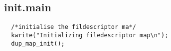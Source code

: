 \documentclass[a4paper,12pt,danish]{report}
\begin{document}
\subsection{init.main}
\begin{verbatim}
  /*initialise the fildescriptor ma*/
  kwrite("Initializing filedescriptor map\n");
  dup_map_init();

\end{verbatim}
\end{document}
